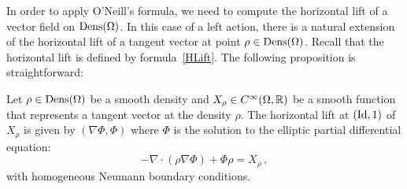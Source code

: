 In order to apply O'Neill's formula, we need to compute the horizontal lift 
of a vector field on  $\operatorname{Dens}(\Omega)$. In this case of a left action, there is a natural extension of the horizontal lift of a tangent vector at point $\rho \in \operatorname{Dens}(\Omega)$. Recall that the horizontal lift is defined by formula~\eqref{HLift}. 
The following proposition is straightforward:
\begin{proposition}\label{HorizontalLiftFormulation}
Let $\rho \in \operatorname{Dens}(\Omega)$ be a smooth density and $X_\rho \in C^\infty(\Omega,\mathbb{R})$ %
be a smooth function that represents a tangent vector at the density $\rho$.
The horizontal lift at $(\operatorname{Id}, 1)$ of $X_\rho$ is given by $(\nabla \Phi,\Phi)$ where $\Phi$ is the solution to the elliptic partial differential equation:
\begin{equation}\label{EllipticEquation}
-\nabla \cdot (\rho \nabla \Phi)  + \Phi \rho = X_\rho\,,
\end{equation}
with homogeneous Neumann boundary conditions.
\end{proposition}

